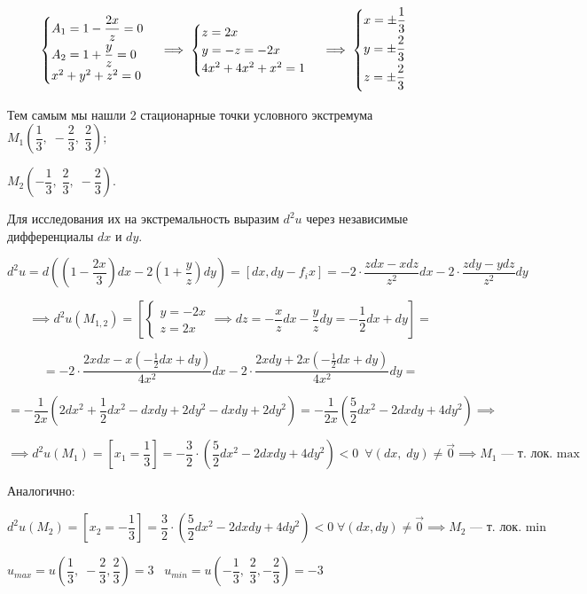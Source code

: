 \documentclass[../../main.tex]{subfiles}
\begin{document}
\begin{example}
	\[\begin{cases}
	\smallskip
	A_1 = 1 - \dfrac{2x}{z} = 0\\
	A_2 = 1 + \dfrac{y}{z} = 0\\
	x^2 + y^2 + z^2 = 0
	\end{cases} \implies \begin{cases}
	z = 2x\\
	y = -z = -2x\\
	4x^2 + 4x^2 + x^2 = 1
	\end{cases} \implies \begin{cases}
	\smallskip
	x = \pm \dfrac{1}{3}\\
	\smallskip
	y = \pm \dfrac{2}{3}\\
	\smallskip
	z = \pm \dfrac{2}{3}\\
	\end{cases}\]
	
	Тем самым мы нашли 2 стационарные точки условного экстремума 
	$M_1\left(\dfrac{1}{3},\; -\dfrac{2}{3},\; \dfrac{2}{3}\right);$
	
	$ M_2\left(-\dfrac{1}{3},\; \dfrac{2}{3}, \; -\dfrac{2}{3}\right)$.
	
	Для исследования их на экстремальность выразим $d^2u$ 
	через независимые дифференциалы $dx$ и $dy$.
	
	\[d^2u = d\left( \left(1 - \dfrac{2x}{3}\right)dx - 
	2\left(1 + \dfrac{y}{z}\right)dy\right) = 
	\left[dx, dy - f_ix\right] = -2 \cdot 
	\dfrac{zdx - xdz}{z^2}dx - 2 \cdot \dfrac{zdy - ydz}{z^2}dy\]
	
	\[\implies d^2u\left(M_{1, 2}\right) = \left[
	\begin{cases}
	y = -2x\\
	z = 2x 
	\end{cases} \implies dz = -\dfrac{x}{z}dx - \dfrac{y}{z}dy = 
	-\dfrac{1}{2}dx + dy 
	\right] =\]
	
	\[ = -2 \cdot \frac{2xdx - x\left(-\frac{1}{2}dx + dy\right)}{4x^2}dx - 
	2 \cdot \frac{2xdy + 2x \left(-\frac{1}{2}dx + dy\right)}{4x^2}dy = \]
	
	\[= -\dfrac{1}{2x}\left(2dx^2 + \dfrac{1}{2}dx^2 - dxdy + 2dy^2 - 
	dxdy + 2dy^2 \right) = -\dfrac{1}{2x} \left( \dfrac{5}
	{2} dx^2 - 2dxdy + 4dy^2 \right) \implies \]
	
	\[\implies d^2u\left(M_1\right) = \left[x_1 = \dfrac{1}{3}\right] = 
	-\dfrac{3}{2}\cdot(\dfrac{5}{2}dx^2 - 2dxdy + 4dy^2) < 0\ \; 
	\forall \left(dx, \; dy\right) \neq \vec{0} \implies 
	M_1 \text{~--- т. лок. max}\]
	
	Аналогично:
	
	\[d^2u \left(M_2\right) = \left[x_2 = -\dfrac{1}{3} \right] = 
	\dfrac{3}{2} \cdot \left( \dfrac{5}{2} dx^2 - 2dxdy + 4dy^2\right) < 0 
	\; \forall \left(dx, dy\right) \neq \vec{0} \implies M_2 
	\text{~--- т. лок. min}\]
	
	$u_{max} = u\left(\dfrac{1}{3}, \; -\dfrac{2}{3}, 
	\dfrac{2}{3}\right) = 3 \;\;\; 
	u_{min} = u\left(-\dfrac{1}{3}, \; 
	\dfrac{2}{3}, -\dfrac{2}{3}\right) = -3$ 
\end{example}
\end{document}
